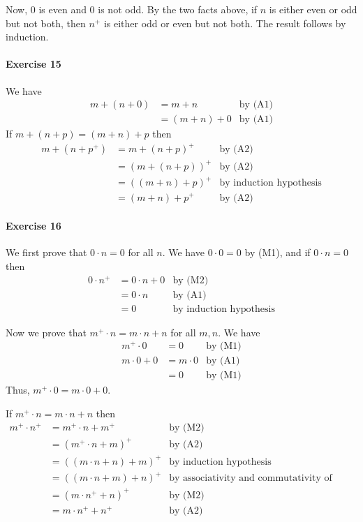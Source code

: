 \documentclass{report}
\begin{document}
    Now, 0 is even and 0 is not odd. By the two facts above, if $n$ is either even or odd but not both,
    then $n^+$ is either odd or even but not both. The result follows by induction.

    \paragraph{Exercise 15}
    We have
    \begin{align*}
        m + (n + 0) & = m + n & \text{by (A1)} \\
        & = (m + n) + 0 & \text{by (A1)}
    \end{align*}
    If $m + (n + p) = (m + n) + p$ then 
    \begin{align*}
        m + (n + p^+) & = m + (n + p)^+ & \text{by (A2)} \\
        & = (m + (n + p))^+ & \text{by (A2)} \\
        & = ((m + n) + p)^+ & \text{by induction hypothesis} \\
        & = (m + n) + p^+ & \text{by (A2)}
    \end{align*}

    \paragraph{Exercise 16}
    We first prove that $0 \cdot n = 0$ for all $n$. We have $0 \cdot 0 = 0$ by (M1), and if
    $0 \cdot n = 0$ then
    \begin{align*}
        0 \cdot n^+ & = 0 \cdot n + 0 & \text{by (M2)} \\
        & = 0 \cdot n & \text{by (A1)} \\
        & = 0 & \text{by induction hypothesis}
    \end{align*}

    Now we prove that $m^+ \cdot n = m \cdot n + n$ for all $m, n$. We have
    \begin{align*}
        m^+ \cdot 0 & = 0 & \text{by (M1)} \\
        m \cdot 0 + 0 & = m \cdot 0 & \text{by (A1)} \\
        & = 0 & \text{by (M1)}
    \end{align*}
    Thus, $m^+ \cdot 0 = m \cdot 0 + 0$.

    If $m^+ \cdot n = m \cdot n + n$ then
    \begin{align*}
        m^+ \cdot n^+ & = m^+ \cdot n + m^+ & \text{by (M2)} \\
        & = (m^+ \cdot n + m)^+ & \text{by (A2)} \\
        & = ((m \cdot n + n) + m)^+ & \text{by induction hypothesis} \\
        & = ((m \cdot n + m) + n)^+ & \text{by associativity and commutativity of addition} \\
        & = (m \cdot n^+ + n)^+ & \text{by (M2)} \\
        & = m \cdot n^+ + n^+ & \text{by (A2)}
    \end{align*}
\end{document}
